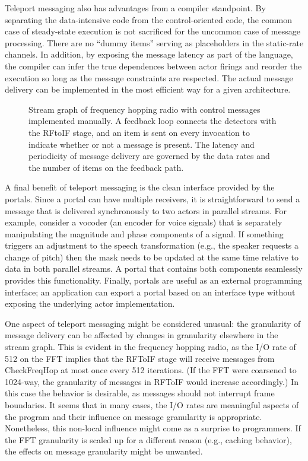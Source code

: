 Teleport messaging also has advantages from a compiler standpoint.  By
separating the data-intensive code from the control-oriented code, the
common case of steady-state execution is not sacrificed for
the uncommon case of message processing.  There are no ``dummy items''
serving as placeholders in the static-rate channels.  In addition, by
exposing the message latency as part of the language, the compiler can
infer the true dependences between actor firings and reorder the
execution so long as the message constraints are respected.  The
actual message delivery can be implemented in the most efficient way
for a given architecture.

\begin{figure}[t]
\centering
\vspace{-12pt}
\vspace{-10pt}
\caption{\small Stream graph of frequency hopping radio with control
messages implemented manually.  A feedback loop connects the detectors
with the RFtoIF stage, and an item is sent on every invocation to
indicate whether or not a message is present.  The latency and
periodicity of message delivery are governed by the data rates and the
number of items on the feedback
path. \protect\label{fig:fhr-manual}}
\vspace{-12pt}
\end{figure}

A final benefit of teleport messaging is the clean interface provided
by the portals.  Since a portal can have multiple receivers, it is
straightforward to send a message that is delivered synchronously to
two actors in parallel streams.  For example, consider a vocoder (an
encoder for voice signals) that is separately manipulating the
magnitude and phase components of a signal.  If something triggers an
adjustment to the speech transformation (e.g., the speaker
requests a change of pitch) then the mask needs to be updated at the
same time relative to data in both parallel streams.  A portal that
contains both components seamlessly provides this functionality.
Finally, portals are useful as an external programming interface; an
application can export a portal based on an interface type without
exposing the underlying actor implementation.

One aspect of teleport messaging might be considered unusual: the
granularity of message delivery can be affected by changes in
granularity elsewhere in the stream graph.  This is evident in the
frequency hopping radio, as the I/O rate of 512 on the FFT implies
that the RFToIF stage will receive messages from CheckFreqHop at most
once every 512 iterations.  (If the FFT were coarsened to 1024-way,
the granularity of messages in RFToIF would increase accordingly.)  In
this case the behavior is desirable, as messages should not interrupt
frame boundaries.  It seems that in many cases, the I/O rates are
meaningful aspects of the program and their influence on message
granularity is appropriate.  Nonetheless, this non-local influence
might come as a surprise to programmers.  If the FFT granularity is
scaled up for a different reason (e.g., caching behavior), the effects
on message granularity might be unwanted.

